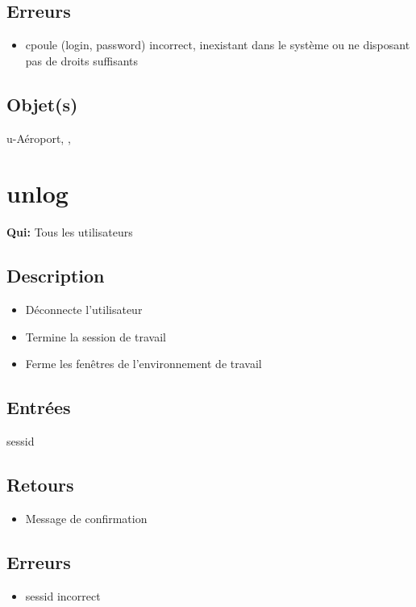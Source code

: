 	\subsection{Erreurs}
	\begin{itemize}
		\item cpoule (login, password) incorrect, inexistant dans le
		système ou ne disposant pas de droits suffisants \fatal
	\end{itemize}

	\subsection{Objet(s)}
		u-Aéroport, \event, \syslog

\section{unlog}
	\textbf{Qui:} Tous les utilisateurs

	\subsection{Description}
	\begin{itemize}
		\item Déconnecte l'utilisateur
		\item Termine la session de travail
		\item Ferme les fenêtres de l'environnement de travail
	\end{itemize}

	\subsection{Entrées}
		sessid

	\subsection{Retours}
	\begin{itemize}
		\item Message de confirmation
	\end{itemize}

	\subsection{Erreurs}
	\begin{itemize}
		\item sessid incorrect \fatal 
	\end{itemize}


